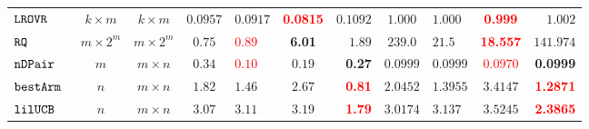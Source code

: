 {\begin {table}[t]
\begin{center}
{\begin{tabular}{|| >{\tiny}l || c | c || c | l | c | r || c | l | c | r || }
        \hhline{||-||---||-||--||----||}
        $\mathtt{LROVR}$  & $k \times m$ &  $ k \times m $  & $0.0957$  & $0.0917$ & \textcolor{red}{\textbf{0.0815}} & $0.1092$  &  $ 1.000  $  &  $ 1.000 $ & \textcolor{red}{\textbf{ 0.999}} & $ 1.002 $  \\
        \hhline{||-||---||-||--||----||}
        $\mathtt{RQ}$~\cite{Jamieson2015TheAO} & $ m \times 2^m $ & $  m \times 2^m $  & $0.75$  & \textcolor{red}{$0.89$} & \textbf{6.01} & $1.89$ & $239.0$   & $21.5$ & \textcolor{red}{\textbf{18.557}} & $141.974$   \\
        \hhline{||-||---||-||--||----||}
        $\mathtt{nDPair}$~\cite{Jamieson2015TheAO} & $ m $ & $  m \times n  $   & $0.34$  & \textcolor{red}{$0.10$} & $0.19$ & \textbf{0.27} & $0.0999$   & $0.0999$ & \textcolor{red}{$0.0970$} & \textbf{0.0999}   \\
        \hhline{||-||---||-||--||----||}
        $\mathtt{bestArm}$~\cite{Jamieson2015TheAO} & $ n $ & $  m \times n $  & $1.82$  & $1.46$ & $2.67$ & \textcolor{red}{\textbf{0.81}}& $ 2.0452$   & $ 1.3955$ & {{$3.4147$}} & \textcolor{red}{\textbf{1.2871}} \\
        \hhline{||-||---||-||--||----||}
        $\mathtt{lilUCB}$~\cite{Jamieson2015TheAO} & $ n $ & $ m \times n $ & $3.07$  & $3.11$ & $3.19$ & \textcolor{red}{\textbf{1.79}}& $3.0174$   & $ 3.137$ & {$3.5245$} & \textcolor{red}{\textbf{2.3865}}   \\

\end{tabular}}
\end{center}
\end{table}}
